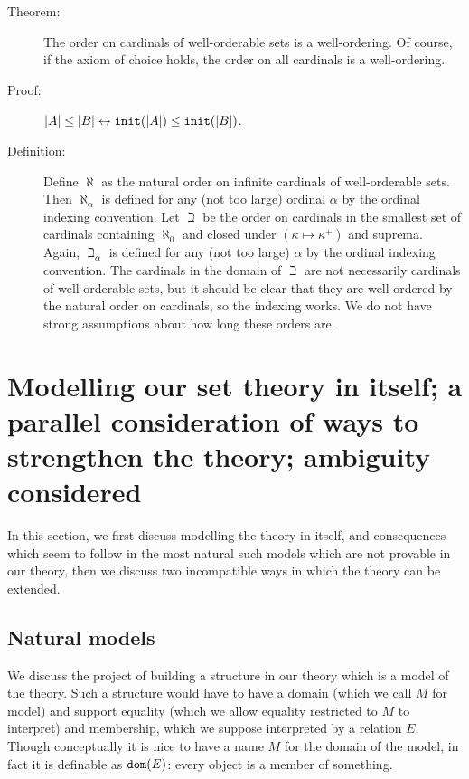 \documentclass[12pt]{article}
\begin{document}
\begin{description}

\item[Theorem:]  The order on cardinals of well-orderable sets is a well-ordering.  Of course, if the axiom of choice holds, the order on all cardinals is a well-ordering.

\item[Proof:]  $|A| \leq |B| \leftrightarrow {\tt init}(|A|) \leq {\tt init}(|B|)$.

\item[Definition:]  Define $\aleph$ as the natural order on infinite cardinals of well-orderable sets.  Then $\aleph_\alpha$ is defined for any (not too large) ordinal $\alpha$ by the ordinal indexing convention.  Let $\beth$ be the order on cardinals in the smallest set of cardinals containing $\aleph_0$ and closed under $(\kappa \mapsto \kappa^+)$ and suprema.  Again, $\beth_\alpha$ is defined for any (not too large) $\alpha$ by the ordinal indexing convention.  The cardinals in the domain of $\beth$ are not necessarily cardinals of well-orderable sets, but it should be clear that they are well-ordered by the natural order on cardinals, so the indexing works.  We do not have strong assumptions about how long these orders are.





\end{description}


\newpage

\section{Modelling our set theory in itself; a parallel consideration of ways to strengthen the theory;  ambiguity considered}

In this section, we first discuss modelling the theory in itself, and consequences which seem to follow in the most natural such models which are not provable in our theory, then we discuss two incompatible ways in which the theory can be extended.

\subsection{Natural models}

We discuss the project of building a structure in our theory which is a model of the theory.   Such a structure would have to have a domain (which we call $M$ for model) and support equality (which we allow equality restricted to $M$ to interpret) and membership, which we suppose interpreted by a relation $E$.  Though conceptually it is nice to have
a name $M$ for the domain of the model, in fact it is definable as ${\tt dom}(E)$:  every object is a member of something.
\end{document}
